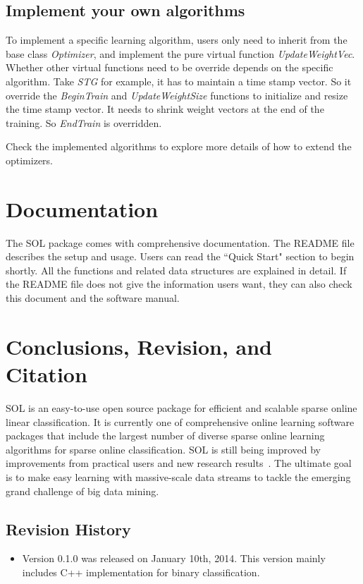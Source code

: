 \documentclass[11pt,a4paper]{article}
\newlength{\wideitemsep}
\let\olditem\item
\renewcommand{\item}{\setlength{\itemsep}{\wideitemsep}\olditem}
\begin{document}
\subsection{Implement your own algorithms}
To implement a specific learning algorithm, users only need to inherit from the
base class \emph{Optimizer}, and implement the pure virtual function
\emph{UpdateWeightVec}. Whether other virtual functions need to be override
depends on the specific algorithm. Take \emph{STG} for example, it has to
maintain a time stamp vector. So it override the \emph{BeginTrain} and
\emph{UpdateWeightSize} functions to initialize and resize the time stamp
vector. It needs to shrink weight vectors at the end of the training. So
\emph{EndTrain} is overridden.

Check the implemented algorithms to explore more details of how to extend the optimizers.

\section{Documentation}

The SOL package comes with comprehensive documentation. The README file describes the setup and usage. Users can read the ``Quick
Start" section to begin shortly. All the functions and related data structures are explained in detail. If the README file does not give the information
users want, they can also check this document and the software manual.

\newpage

\section{Conclusions, Revision, and Citation}
SOL is an easy-to-use open source package for efficient and scalable sparse
online linear classification. It is currently one of comprehensive online
learning software packages that include the largest number of diverse sparse
online learning algorithms for sparse online classification. SOL is still being improved by improvements from practical users and new research results~. The ultimate goal is to make easy learning with massive-scale data streams to tackle the emerging grand challenge of big data mining.


\subsection*{Revision History}
\begin{itemize}
    \item{Version 0.1.0} was released on January 10th, 2014. This version
        mainly includes C++ implementation for binary classification. 
\end{itemize}
\end{document}
